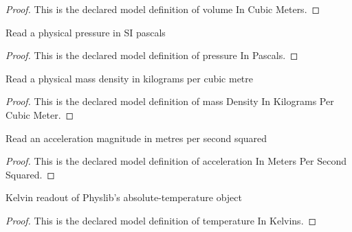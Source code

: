 \begin{proof}
  This is the declared model definition of volume In Cubic Meters.
\end{proof}
\begin{definition}
  \label{def:physics:phyx-mini-0366:phyxminiproblems-problemphyxmini0366-pressureinpascals}
  Read a physical pressure in SI pascals
\end{definition}
\begin{proof}
  This is the declared model definition of pressure In Pascals.
\end{proof}
\begin{definition}
  \label{def:physics:phyx-mini-0366:phyxminiproblems-problemphyxmini0366-massdensityinkilogramspercubicmeter}
  Read a physical mass density in kilograms per cubic metre
\end{definition}
\begin{proof}
  This is the declared model definition of mass Density In Kilograms Per Cubic Meter.
\end{proof}
\begin{definition}
  \label{def:physics:phyx-mini-0366:phyxminiproblems-problemphyxmini0366-accelerationinmeterspersecondsquared}
  Read an acceleration magnitude in metres per second squared
\end{definition}
\begin{proof}
  This is the declared model definition of acceleration In Meters Per Second Squared.
\end{proof}
\begin{definition}
  \label{def:physics:phyx-mini-0366:phyxminiproblems-problemphyxmini0366-temperatureinkelvins}
  Kelvin readout of Physlib's absolute-temperature object
\end{definition}
\begin{proof}
  This is the declared model definition of temperature In Kelvins.
\end{proof}
